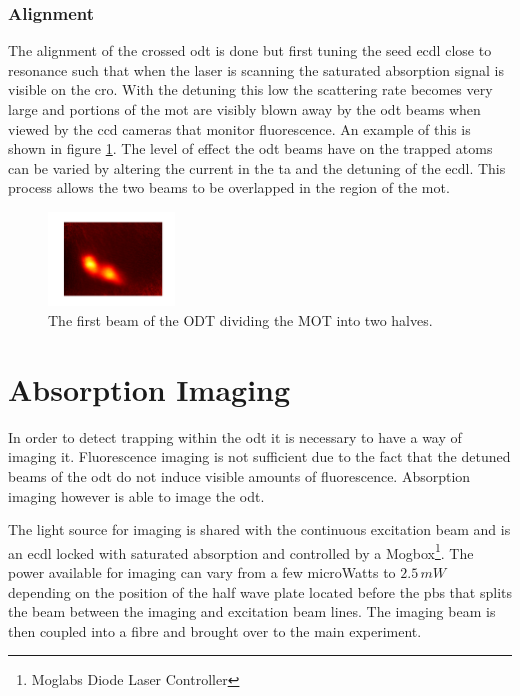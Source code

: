 \subsubsection{Alignment}

The alignment of the crossed \gls{odt} is done but first tuning the seed \gls{ecdl} close to resonance such that when the laser is scanning the saturated absorption signal is visible on the \gls{cro}. With the detuning this low the scattering rate becomes very large and portions of the \gls{mot} are visibly blown away by the \gls{odt} beams when viewed by the \gls{ccd} cameras that monitor fluorescence. An example of this is shown in figure \ref{fig:mot_slice}. The level of effect the \gls{odt} beams have on the trapped atoms can be varied by altering the current in the \gls{ta} and the detuning of the \gls{ecdl}. This process allows the two beams to be overlapped in the region of the \gls{mot}.

\begin{figure}[H]
\centering
\includegraphics[width=0.3\textwidth]{figs/mot_slice.pdf}
\caption{The first beam of the ODT dividing the MOT into two halves.}
\label{fig:mot_slice}
\end{figure}

\section{Absorption Imaging}

In order to detect trapping within the \gls{odt} it is necessary to have a way of imaging it. Fluorescence imaging is not sufficient due to the fact that the detuned beams of the \gls{odt} do not induce visible amounts of fluorescence. Absorption imaging however is able to image the \gls{odt}.

The light source for imaging is shared with the continuous excitation beam and is an \gls{ecdl} locked with saturated absorption and controlled by a Mogbox\footnote{Moglabs Diode Laser Controller}. The power available for imaging can vary from a few microWatts to $2.5\,\unit{mW}$ depending on the position of the half wave plate located before the \gls{pbs} that splits the beam between the imaging and excitation beam lines. The imaging beam is then coupled into a fibre and brought over to the main experiment.

